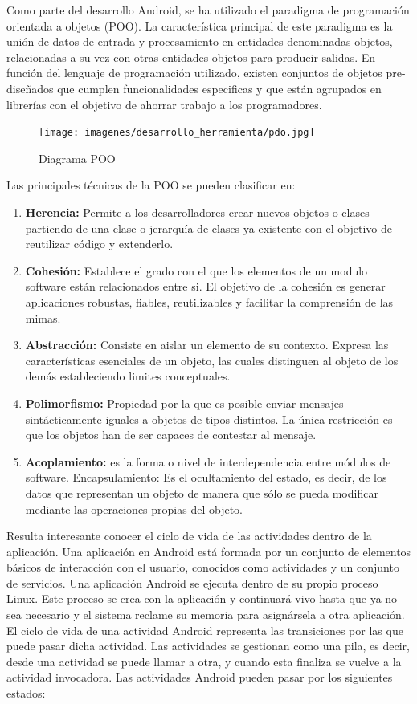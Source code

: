 \documentclass[a4paper,11pt]{book}
\begin{document}
Como parte del desarrollo Android, se ha utilizado el paradigma de programación orientada a objetos (POO)\cite{ood}. La característica principal de este paradigma es la unión de datos de entrada y procesamiento en entidades denominadas objetos,  relacionadas a su vez con otras entidades objetos para producir salidas. En función del lenguaje de programación utilizado, existen conjuntos de objetos pre-diseñados que cumplen funcionalidades especificas y que están agrupados en librerías con el objetivo de ahorrar trabajo a los programadores.


\begin{figure}[H] 
\centering 
\texttt{[image: imagenes/desarrollo\_herramienta/pdo.jpg]}
\caption{ Diagrama POO\cite{poo}}
\end{figure}


Las principales técnicas de la POO se pueden clasificar en:


\begin{enumerate}
\item \textbf{Herencia:} Permite a los desarrolladores crear nuevos objetos o clases partiendo de una clase o jerarquía de clases ya existente con el objetivo de reutilizar código y extenderlo. 
\item \textbf{Cohesión:} Establece el grado con el que los elementos de un modulo software están relacionados entre si. El objetivo de la cohesión es generar aplicaciones robustas, fiables, reutilizables y facilitar la comprensión de las mimas.
\item \textbf{Abstracción:} Consiste en aislar un elemento de su contexto. Expresa las características esenciales de un objeto, las cuales distinguen al objeto de los demás estableciendo limites conceptuales.
\item \textbf{Polimorfismo:} Propiedad por la que es posible enviar mensajes sintácticamente iguales a objetos de tipos distintos. La única restricción es que los objetos han de ser capaces de contestar al mensaje. 
\item \textbf{Acoplamiento:} es la forma o nivel de interdependencia entre módulos de software. 
 Encapsulamiento: Es el ocultamiento del estado, es decir, de los datos que representan un objeto de manera que sólo se pueda modificar mediante las operaciones propias del objeto.
\end{enumerate}


Resulta interesante conocer el ciclo de vida\cite{col} de las actividades dentro de la aplicación. Una aplicación en Android está formada por un conjunto de elementos básicos de interacción con el usuario, conocidos como actividades y un conjunto de servicios. Una aplicación Android se ejecuta dentro de su propio proceso Linux. Este proceso se crea con la aplicación y continuará vivo hasta que ya no sea necesario y el sistema reclame su memoria para asignársela a otra aplicación. El ciclo de vida de una actividad Android representa las transiciones por las que puede pasar dicha actividad. Las actividades se gestionan como una pila, es decir, desde una actividad se puede llamar a otra, y cuando esta finaliza se vuelve a la actividad invocadora. Las actividades Android pueden pasar por los siguientes estados:
\end{document}
